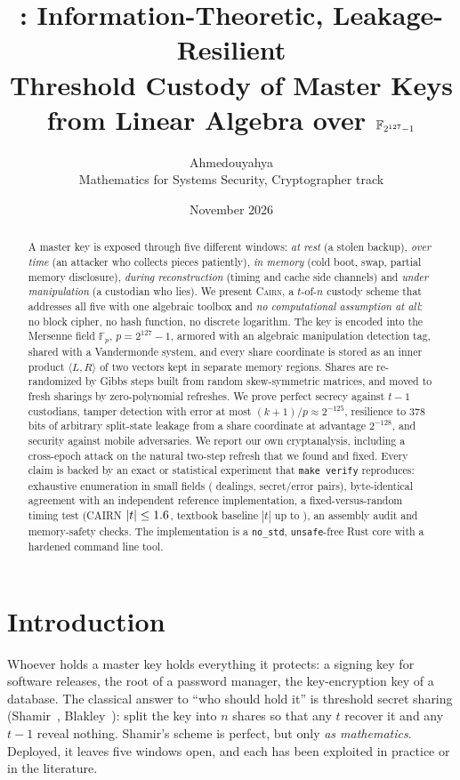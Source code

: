 \documentclass[10.5pt,a4paper]{article}
\title{\textbf{\cairn{}}: Information-Theoretic, Leakage-Resilient\\Threshold Custody of Master Keys from Linear Algebra over $\mathbb{F}_{2^{127}-1}$}
\author{Ahmedouyahya\\[2pt]\small Mathematics for Systems Security, Cryptographer track}
\date{November 2026}
\theoremstyle{plain}
\theoremstyle{definition}
\newcommand{\Fp}{\mathbb{F}_p}
\newcommand{\ip}[2]{\langle #1,#2\rangle}
\newcommand{\cairn}{\textsc{Cairn}}
\newcommand{\code}[1]{\texttt{#1}}
\begin{document}
\maketitle

\begin{abstract}
\noindent
A master key is exposed through five different windows: \emph{at rest} (a stolen backup), \emph{over time} (an attacker who collects pieces patiently), \emph{in memory} (cold boot, swap, partial memory disclosure), \emph{during reconstruction} (timing and cache side channels) and \emph{under manipulation} (a custodian who lies). We present \cairn{}, a $t$-of-$n$ custody scheme that addresses all five with one algebraic toolbox and \emph{no computational assumption at all}: no block cipher, no hash function, no discrete logarithm. The key is encoded into the Mersenne field $\Fp$, $p=2^{127}-1$, armored with an algebraic manipulation detection tag, shared with a Vandermonde system, and every share coordinate is stored as an inner product $\ip{L}{R}$ of two vectors kept in separate memory regions. Shares are re-randomized by Gibbs steps built from random skew-symmetric matrices, and moved to fresh sharings by zero-polynomial refreshes. We prove perfect secrecy against $t-1$ custodians, tamper detection with error at most $(k+1)/p\approx 2^{-125}$, resilience to $378$ bits of arbitrary split-state leakage from a share coordinate at advantage $2^{-128}$, and security against mobile adversaries. We report our own cryptanalysis, including a cross-epoch attack on the natural two-step refresh that we found and fixed. Every claim is backed by an exact or statistical experiment that \code{make verify} reproduces: exhaustive enumeration in small fields (\SecrecyDealings{} dealings, \AmdPairs{} secret/error pairs), byte-identical agreement with an independent reference implementation, a fixed-versus-random timing test (CAIRN $|t|\le1.6$, textbook baseline $|t|$ up to \DudectMulNaive{}), an assembly audit and memory-safety checks. The implementation is a \code{no\_std}, \code{unsafe}-free Rust core with a hardened command line tool.
\end{abstract}

\section{Introduction}\label{sec:intro}

Whoever holds a master key holds everything it protects: a signing key for software releases, the root of a password manager, the key-encryption key of a database. The classical answer to ``who should hold it'' is threshold secret sharing (Shamir~\cite{shamir79}, Blakley~\cite{blakley79}): split the key into $n$ shares so that any $t$ recover it and any $t-1$ reveal nothing. Shamir's scheme is perfect, but only \emph{as mathematics}. Deployed, it leaves five windows open, and each has been exploited in practice or in the literature.
\end{document}
